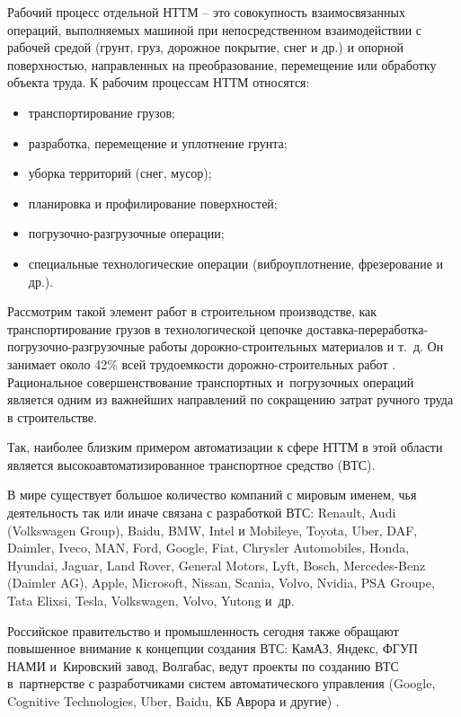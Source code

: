 Рабочий процесс отдельной НТТМ -- это совокупность взаимосвязанных операций, выполняемых машиной при непосредственном взаимодействии с рабочей средой (грунт, груз, дорожное покрытие, снег и др.) и опорной поверхностью, направленных на преобразование, перемещение или обработку объекта труда. К рабочим процессам НТТМ относятся:

\begin{itemize}[beginpenalty=10000, midpenalty=10000, wide=\parindent, leftmargin=0pt]
	\item транспортирование грузов;
	\item разработка, перемещение и уплотнение грунта;
	\item уборка территорий (снег, мусор);
	\item планировка и профилирование поверхностей;
	\item погрузочно-разгрузочные операции;
	\item специальные технологические операции (виброуплотнение, фрезерование и др.).
\end{itemize}

Рассмотрим такой элемент работ в строительном производстве, как транспортирование грузов в технологической цепочке доставка-переработка-погрузочно-разгрузочные работы дорожно-строительных материалов и т.\ д. Он занимает около 42\% всей трудоемкости дорожно-строительных работ \cite{Vilman, grushezkii_and_2021}. Рациональное совершенствование транспортных и~погрузочных операций является одним из важнейших направлений по сокращению затрат ручного труда в строительстве.

Так, наиболее близким примером автоматизации к сфере НТТМ в этой области является высокоавтоматизированное транспортное средство (ВТС).


В мире существует большое количество компаний с мировым именем, чья деятельность так или иначе связана с разработкой ВТС: Renault, Audi (Volkswagen Group), Baidu, BMW, Intel и Mobileye, Toyota, Uber, DAF, Daimler, Iveco, MAN, Ford,  Google, Fiat, Chrysler Automobiles, Honda, Hyundai, Jaguar, Land Rover, General Motors, Lyft, Bosch, Mercedes-Benz (Daimler AG), Apple, Microsoft, Nissan, Scania, Volvo, Nvidia, PSA Groupe, Tata Elixsi, Tesla, Volkswagen, Volvo, Yutong и~др.

Российское правительство и промышленность сегодня также обращают повышенное внимание к концепции создания ВТС: КамАЗ, Яндекс, ФГУП НАМИ и~Кировский завод, Волгабас, ведут проекты по созданию ВТС в~партнерстве с разработчиками систем автоматического управления (Google, Cognitive Technologies, Uber, Baidu, КБ Аврора и другие) \cite{AleshinMendozaTarasovKlyavin2018}.

